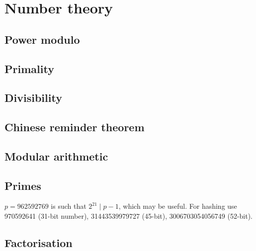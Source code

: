 
\chapter{Number theory}

	\section{Power modulo}

	\section{Primality}

	\section{Divisibility}

	\section{Chinese reminder theorem}

	\section{Modular arithmetic}

	\section{Primes}
		$p=962592769$ is such that $2^{21} \mid p-1$, which may be useful. For hashing
		use 970592641 (31-bit number), 31443539979727 (45-bit), 3006703054056749
		(52-bit).

	\section{Factorisation}
